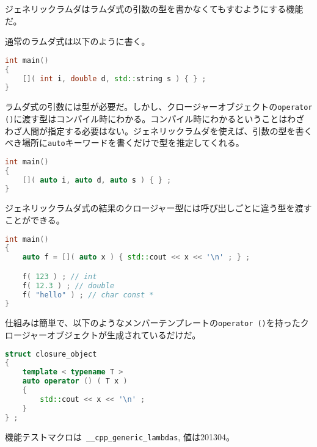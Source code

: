 %

ジェネリックラムダはラムダ式の引数の型を書かなくてもすむようにする機能だ。

通常のラムダ式は以下のように書く。

\begin{lstlisting}[language=C++]
int main()
{
    []( int i, double d, std::string s ) { } ;
}
\end{lstlisting}

ラムダ式の引数には型が必要だ。しかし、クロージャーオブジェクトの\lstinline!operator ()!に渡す型はコンパイル時にわかる。コンパイル時にわかるということはわざわざ人間が指定する必要はない。ジェネリックラムダを使えば、引数の型を書くべき場所に\lstinline!auto!キーワードを書くだけで型を推定してくれる。

\begin{lstlisting}[language=C++]
int main()
{
    []( auto i, auto d, auto s ) { } ;
}
\end{lstlisting}

ジェネリックラムダ式の結果のクロージャー型には呼び出しごとに違う型を渡すことができる。

\begin{lstlisting}[language=C++]
int main()
{
    auto f = []( auto x ) { std::cout << x << '\n' ; } ;

    f( 123 ) ; // int
    f( 12.3 ) ; // double
    f( "hello" ) ; // char const *
}
\end{lstlisting}

仕組みは簡単で、以下のようなメンバーテンプレートの\lstinline!operator ()!を持ったクロージャーオブジェクトが生成されているだけだ。

\begin{lstlisting}[language=C++]
struct closure_object
{
    template < typename T >
    auto operator () ( T x )
    {
        std::cout << x << '\n' ;
    }
} ;
\end{lstlisting}

機能テストマクロは~\lstinline!__cpp_generic_lambdas!, 値は201304。
